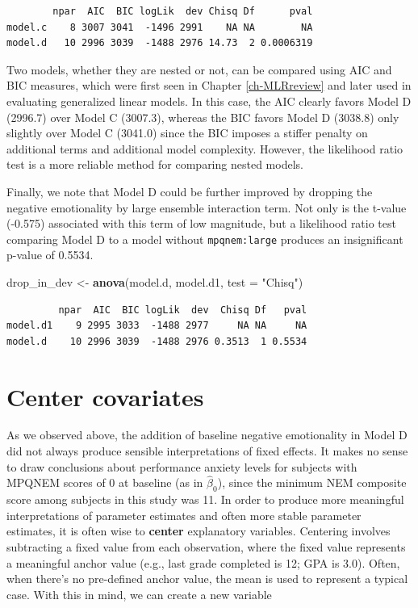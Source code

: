 \documentclass[
]{krantz}
\newenvironment{Shaded}{\begin{snugshade}}{\end{snugshade}}
\newcommand{\DataTypeTok}[1]{\textcolor[rgb]{0.27,0.27,0.27}{#1}}
\newcommand{\KeywordTok}[1]{\textcolor[rgb]{0.27,0.27,0.27}{\textbf{#1}}}
\newcommand{\NormalTok}[1]{#1}
\newcommand{\StringTok}[1]{\textcolor[rgb]{0.5,0.5,0.5}{#1}}
\begin{document}
\begin{verbatim}
        npar  AIC  BIC logLik  dev Chisq Df      pval
model.c    8 3007 3041  -1496 2991    NA NA        NA
model.d   10 2996 3039  -1488 2976 14.73  2 0.0006319
\end{verbatim}

Two models, whether they are nested or not, can be compared using AIC and BIC measures, which were first seen in Chapter \ref{ch-MLRreview} and later used in evaluating generalized linear models. In this case, the AIC clearly favors Model D (2996.7) over Model C (3007.3), whereas the BIC favors Model D (3038.8) only slightly over Model C (3041.0) since the BIC imposes a stiffer penalty on additional terms and additional model complexity. However, the likelihood ratio test is a more reliable method for comparing nested models.

Finally, we note that Model D could be further improved by dropping the negative emotionality by large ensemble interaction term. Not only is the t-value (-0.575) associated with this term of low magnitude, but a likelihood ratio test comparing Model D to a model without \texttt{mpqnem:large} produces an insignificant p-value of 0.5534.

\begin{Shaded}
\begin{Highlighting}[]
\NormalTok{drop_in_dev <-}\StringTok{ }\KeywordTok{anova}\NormalTok{(model.d, model.d1, }\DataTypeTok{test =} \StringTok{"Chisq"}\NormalTok{)}
\end{Highlighting}
\end{Shaded}

\begin{verbatim}
         npar  AIC  BIC logLik  dev  Chisq Df   pval
model.d1    9 2995 3033  -1488 2977     NA NA     NA
model.d    10 2996 3039  -1488 2976 0.3513  1 0.5534
\end{verbatim}

\hypertarget{sec:modele}{%
\section{Center covariates}\label{sec:modele}}

As we observed above, the addition of baseline negative emotionality in Model D did not always produce sensible interpretations of fixed effects. It makes no sense to draw conclusions about performance anxiety levels for subjects with MPQNEM scores of 0 at baseline (as in \(\hat{\beta}_{0}\)), since the minimum NEM composite score among subjects in this study was 11. In order to produce more meaningful interpretations of parameter estimates and often more stable parameter estimates, it is often wise to \textbf{center}  explanatory variables. Centering involves subtracting a fixed value from each observation, where the fixed value represents a meaningful anchor value (e.g., last grade completed is 12; GPA is 3.0). Often, when there's no pre-defined anchor value, the mean is used to represent a typical case. With this in mind, we can create a new variable
\end{document}
